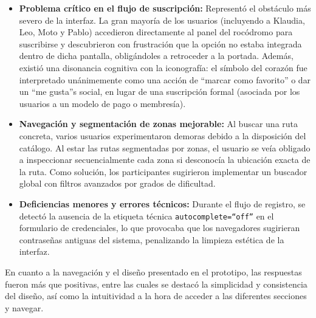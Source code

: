 \begin{itemize}
    \item \textbf{Problema crítico en el flujo de suscripción:} Representó el obstáculo más severo de la interfaz. La gran mayoría de los usuarios (incluyendo a Klaudia, Leo, Moto y Pablo) accedieron directamente al panel del rocódromo para suscribirse y descubrieron con frustración que la opción no estaba integrada dentro de dicha pantalla, obligándoles a retroceder a la portada. Además, existió una disonancia cognitiva con la iconografía: el símbolo del corazón fue interpretado unánimemente como una acción de ``marcar como favorito'' o dar un ``me gusta''s  social, en lugar de una suscripción formal (asociada por los usuarios a un modelo de pago o membresía).
    \item \textbf{Navegación y segmentación de zonas mejorable:} Al buscar una ruta concreta, varios usuarios experimentaron demoras debido a la disposición del catálogo. Al estar las rutas segmentadas por zonas, el usuario se veía obligado a inspeccionar secuencialmente cada zona si desconocía la ubicación exacta de la ruta. Como solución, los participantes sugirieron implementar un buscador global con filtros avanzados por grados de dificultad.
    \item \textbf{Deficiencias menores y errores técnicos:} Durante el flujo de registro, se detectó la ausencia de la etiqueta técnica \texttt{autocomplete=``off''} en el formulario de credenciales, lo que provocaba que los navegadores sugirieran contraseñas antiguas del sistema, penalizando la limpieza estética de la interfaz.
\end{itemize}

En cuanto a la navegación y el diseño presentado en el prototipo, las respuestas fueron más que positivas, entre las cuales se destacó la simplicidad y consistencia del diseño, así como la intuitividad a la hora de acceder a las diferentes secciones y navegar.

